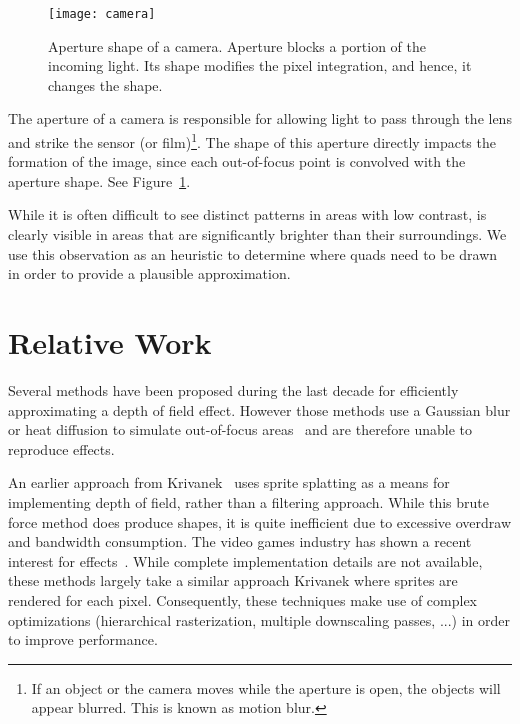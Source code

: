 	\begin{figure}[htb]\centering
	\texttt{[image: camera]}
	\caption{Aperture shape of a camera. Aperture blocks a portion of the incoming light. Its shape modifies the pixel integration, and hence, it changes the \bokeh shape. }
	\label{DeRousiers:camera}
	\end{figure}

The aperture of a camera is responsible for allowing light to pass through the lens and strike the sensor (or film)\footnote{If an object or the camera moves while the aperture is open, the objects will appear blurred. This is known as motion blur.}. The shape of this aperture directly impacts the formation of the image, since each out-of-focus point is convolved with the aperture shape. See Figure~\ref{DeRousiers:camera}.

While it is often difficult to see distinct \bokeh patterns in areas with low contrast, \bokeh is clearly visible in areas that are significantly brighter than their surroundings. We use this observation as an heuristic to determine where \bokeh quads need to be drawn in order to provide a plausible approximation.

\section{Relative Work}\label{Derousiers:RelativeWork}

Several methods have been proposed during the last decade for efficiently approximating a depth of field effect. However those methods use a Gaussian blur or heat diffusion to simulate out-of-focus areas~\cite{Hammon07,Kosloff07} and are therefore unable to reproduce \bokeh effects.

An earlier approach from Krivanek~\cite{Krivanek03} uses sprite splatting as a means for implementing depth of field, rather than a filtering approach. While this brute force method does produce \bokeh shapes, it is quite inefficient due to excessive overdraw and bandwidth consumption. The video games industry has shown a recent interest for \bokeh effects~\cite{Sousa11,Futurmark11,Mittring11}. While complete implementation details are not available, these methods largely take a similar approach Krivanek where sprites are rendered for each pixel. Consequently, these techniques make use of complex optimizations (hierarchical rasterization, multiple downscaling passes, ...) in order to improve performance. 

